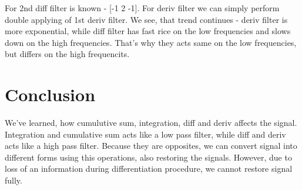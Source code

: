 \documentclass[a4paper]{article}
\begin{document}
        For 2nd diff filter is known - [-1 2 -1]. For deriv filter we can simply perform double applying of 1st deriv filter. We see, that trend continues - deriv filter is more exponential, while diff filter has fast rice on the low frequencies and slows down on the high frequencies. That's why they acts same on the low frequencies, but differs on the high frequencits.
            
    \newpage
        \section{Conclusion}
            We've learned, how cumulutive sum, integration, diff and deriv affects the signal. Integration and cumulative sum acts like a low pass filter, while diff and deriv acts like a high pass filter. Because they are opposites, we can convert signal into different forms using this operations, also restoring the signals. However, due to loss of an information during differentiation procedure, we cannot restore signal fully.
     
\end{document}
